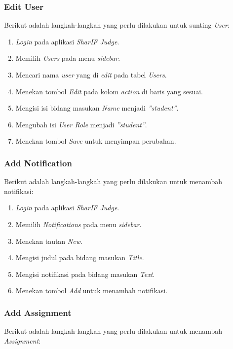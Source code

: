 \subsubsection{Edit User}
\label{subsubsec:skenario_edit_user}
Berikut adalah langkah-langkah yang perlu dilakukan untuk sunting \textit{User}:

\begin{enumerate}
	\item \textit{Login} pada aplikasi \textit{SharIF Judge}.
	\item Memilih \textit{Users} pada menu \textit{sidebar}.
	\item Mencari nama \textit{user} yang di \textit{edit} pada tabel \textit{Users}.
	\item Menekan tombol \textit{Edit} pada kolom \textit{action} di baris yang sesuai.
	\item Mengisi isi bidang masukan \textit{Name} menjadi \textit{''student''}.
	\item Mengubah isi \textit{User Role} menjadi \textit{''student''}. 
	\item Menekan tombol \textit{Save} untuk menyimpan perubahan.
\end{enumerate}	

\subsubsection{Add Notification}
\label{subsubsec:skenario_add_notification}
Berikut adalah langkah-langkah yang perlu dilakukan untuk menambah notifikasi:

\begin{enumerate}
	\item \textit{Login} pada aplikasi \textit{SharIF Judge}.
	\item Memilih \textit{Notifications} pada menu \textit{sidebar}.
	\item Menekan tautan \textit{New}.
	\item Mengisi judul pada bidang masukan \textit{Title}.
	\item Mengisi notifikasi pada bidang masukan \textit{Text}.
	\item Menekan tombol \textit{Add} untuk menambah notifikasi.
\end{enumerate}

\subsubsection{Add Assignment}
\label{subsubsec:skenario_add_assignment}
Berikut adalah langkah-langkah yang perlu dilakukan untuk menambah \textit{Assignment}:

